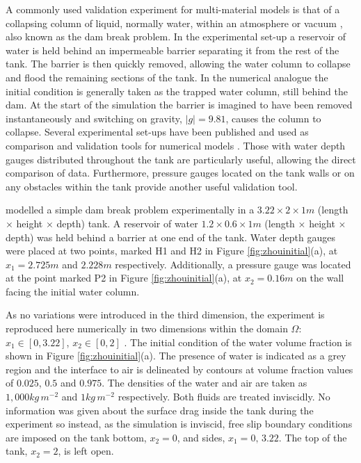 

A commonly used validation experiment for multi-material models is that of a collapsing column of liquid, normally water, within an atmosphere or vacuum \citep{lakehal_interface_2002}, also known as the dam break problem.  In the experimental set-up a reservoir of water is held behind an impermeable barrier separating it from the rest of the tank.  The barrier is then quickly removed, allowing the water column to collapse and flood the remaining sections of the tank.  In the numerical analogue the initial condition is generally taken as the trapped water column, still behind the dam.  At the start of the simulation the barrier is imagined to have been removed instantaneously and switching on gravity, $|g| = 9.81$, causes the column to collapse.   Several experimental set-ups have been published and used as comparison and validation tools for numerical models \citep{martin_part_1952, greaves_simulation_2006}.  Those with water depth gauges distributed throughout the tank are particularly useful, allowing the direct comparison of data.  Furthermore, pressure gauges located on the tank walls or on any obstacles within the tank provide another useful validation tool.

\citet{zhou_nonlinear_1999} modelled a simple dam break problem experimentally in a $3.22\times2\times1m$ (length $\times$ height $\times$ depth) tank.  A reservoir of water $1.2\times0.6\times1m$ (length $\times$ height $\times$ depth) was held behind a barrier at one end of the tank.  Water depth gauges were placed at two points, marked H1 and H2 in Figure \ref{fig:zhouinitial}(a), at $x_1 = 2.725m$ and $2.228m$ respectively.  Additionally, a pressure gauge was located at the point marked P2 in Figure \ref{fig:zhouinitial}(a), at $x_2=0.16m$ on the wall facing the initial water column.

As no variations were introduced in the third dimension, the experiment is reproduced here numerically in two dimensions within the domain $\Omega$: $x_1 \in [0,3.22]$, $x_2 \in [0,2]$ \citep{lee_numerical_2002, colagrossi_numerical_2003, park_volume-of-fluid_2009}.  The initial condition of the water volume fraction is shown in Figure \ref{fig:zhouinitial}(a).  The presence of water is indicated as a grey region and the interface to air is delineated by contours at volume fraction values of $0.025$, $0.5$ and $0.975$.  The densities of the water and air are taken as $ 1,000kg\,m^{-2}$ and $1kg\,m^{-2}$ respectively.  Both fluids are treated inviscidly.  No information was given about the surface drag inside the tank during the experiment so instead, as the simulation is inviscid, free slip boundary conditions are imposed on the tank bottom, $x_2=0$, and sides, $x_1=0,\,3.22$.  The top of the tank, $x_2=2$, is left open.

